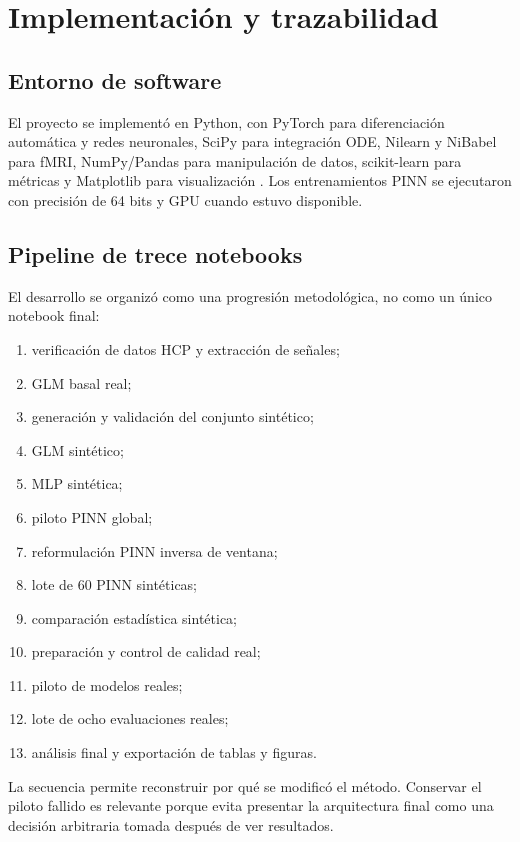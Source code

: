 \chapter{Implementación y trazabilidad}

\section{Entorno de software}
El proyecto se implementó en Python, con PyTorch para diferenciación automática y redes neuronales, SciPy para integración ODE, Nilearn y NiBabel para fMRI, NumPy/Pandas para manipulación de datos, scikit-learn para métricas y Matplotlib para visualización \citep{Paszke2019}. Los entrenamientos PINN se ejecutaron con precisión de 64 bits y GPU cuando estuvo disponible.

\section{Pipeline de trece notebooks}
El desarrollo se organizó como una progresión metodológica, no como un único notebook final:
\begin{enumerate}
  \item verificación de datos HCP y extracción de señales;
  \item GLM basal real;
  \item generación y validación del conjunto sintético;
  \item GLM sintético;
  \item MLP sintética;
  \item piloto PINN global;
  \item reformulación PINN inversa de ventana;
  \item lote de 60 PINN sintéticas;
  \item comparación estadística sintética;
  \item preparación y control de calidad real;
  \item piloto de modelos reales;
  \item lote de ocho evaluaciones reales;
  \item análisis final y exportación de tablas y figuras.
\end{enumerate}

La secuencia permite reconstruir por qué se modificó el método. Conservar el piloto fallido es relevante porque evita presentar la arquitectura final como una decisión arbitraria tomada después de ver resultados.

